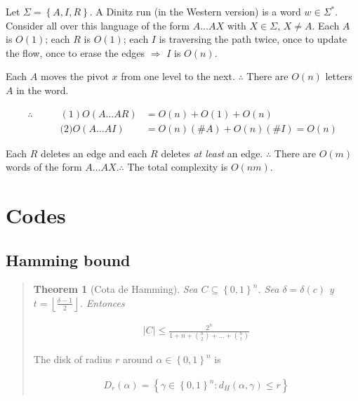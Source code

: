 \documentclass[a4paper, 12pt]{article}
\newtheorem{theorem}{Theorem}
\newtheorem{theorem}{Theorem}
\begin{document}
Let $\Sigma = \left\{ A, I, R \right\} $. A Dinitz run (in the Western version)
is a word $w \in \Sigma^{*} $. Consider all  over this language of the form $A
\ldots AX$ with $X \in \Sigma$, $X \neq A$. Each $A$ is $O(1)$;
each $R$ is $O(1)$; each $I$ is traversing the path twice, once to update the flow,
once to erase the edges $\Rightarrow$ $I$ is $O(n)$.

Each $A$ moves the pivot $x$ from one level to the next. $\therefore $ There 
are $O(n)$ letters $A$ in the word. 

\begin{align*}
    \therefore \qquad &(1) O(A \ldots A R) &= O(n) + O(1) + O(n) \\ 
               &\textit{(2)} O(A \ldots AI) &= O(n)(\#A) + O(n)(\#I) = O(n)
\end{align*}

Each $R$ deletes an edge and each $R$ deletes \textit{at least} an edge.
$\therefore $ There are $O(m)$ words of the form $A\ldots AX$.$\therefore $ The
total complexity is $O(nm)$.




\pagebreak

\section{Codes}

\subsection{Hamming bound}

\begin{quote}
\begin{theorem}[Cota de Hamming]
    Sea $C \subseteq \left\{ 0, 1 \right\}^n $. Sea $\delta = \delta(c)$ y $t =
    \left\lfloor \frac{\delta-1}{2} \right\rfloor$. Entonces 

    \begin{align*}
        |C| \leq \frac{2^n}{1 + n + \binom{n}{2} + \ldots  + \binom{n}{t}}
    \end{align*}
\end{theorem}


    \begin{definition}[Disco]
        The disk of radius $r$ around $\alpha \in \left\{ 0, 1 \right\}^n $ is
    
        \begin{align*}
            D_r(\alpha) = \left\{ \gamma \in \left\{ 0, 1 \right\}^n : d_H(\alpha, \gamma) \leq r  \right\} 
        \end{align*}
    \end{definition}
\end{quote}
\end{document}
